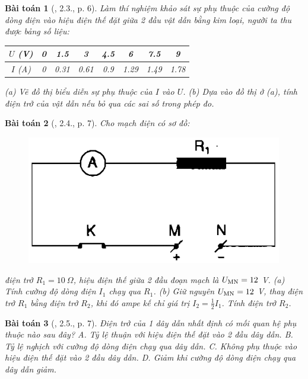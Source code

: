 \documentclass{article}
\newtheorem{baitoan}{Bài toán}
\begin{document}
\begin{baitoan}[\cite{SBT_Vat_Ly_9}, 2.3., p. 6]
	Làm thí nghiệm khảo sát sự phụ thuộc của cường độ dòng điện vào hiệu điện thế đặt giữa 2 đầu vật dẫn bằng kim loại, người ta thu được bảng số liệu:
	\begin{table}[H]
		\centering
		\begin{tabular}{|c|c|c|c|c|c|c|c|}
			\hline
			$U$ (V) & 0 & 1.5 & 3 & 4.5 & 6 & 7.5 & 9 \\
			\hline
			$I$ (A) & 0 & 0.31 & 0.61 & 0.9 & 1.29 & 1.49 & 1.78 \\
			\hline
		\end{tabular}
	\end{table}
	\noindent(a) Vẽ đồ thị biểu diễn sự phụ thuộc của $I$ vào $U$. (b) Dựa vào đồ thị ở (a), tính điện trở của vật dẫn nếu bỏ qua các sai số trong phép đo.
\end{baitoan}

\begin{baitoan}[\cite{SBT_Vat_Ly_9}, 2.4., p. 7]
	Cho mạch điện có sơ đồ:
	\begin{figure}[H]
		\centering
		\includegraphics[scale=0.25]{SBT_2.2}
	\end{figure}
	\noindent điện trở $R_1 = 10\ \Omega$, hiệu điện thế giữa 2 đầu đoạn mạch là $U_{\rm MN} = 12$ \emph{V}. (a) Tính cường độ dòng điện $I_1$ chạy qua $R_1$. (b) Giữ nguyên $U_{\rm MN} = 12$ \emph{V}, thay điện trở $R_1$ bằng điện trở $R_2$, khi đó ampe kế chỉ giá trị $I_2 = \frac{1}{2}I_1$. Tính điện trở $R_2$.
\end{baitoan}

\begin{baitoan}[\cite{SBT_Vat_Ly_9}, 2.5., p. 7]
	Điện trở của 1 dây dẫn nhất định có mối quan hệ phụ thuộc nào sau đây? {\sf A.} Tỷ lệ thuận với hiệu điện thế đặt vào 2 đầu dây dẫn. {\sf B.} Tỷ lệ nghịch với cường độ dòng điện chạy qua dây dẫn. {\sf C.} Không phụ thuộc vào hiệu điện thế đặt vào 2 đầu dây dẫn. {\sf D.} Giảm khi cường độ dòng điện chạy qua dây dẫn giảm.
\end{baitoan}
\end{document}
